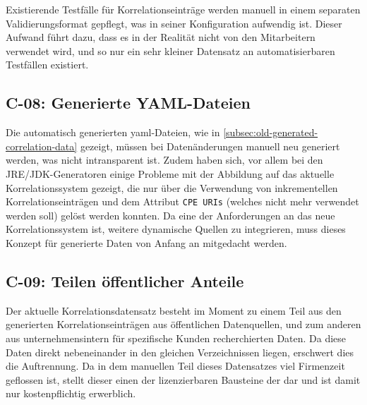 Existierende Testfälle für Korrelationseinträge werden manuell in einem separaten Validierungsformat gepflegt, was in seiner Konfiguration aufwendig ist.
Dieser Aufwand führt dazu, dass es in der Realität nicht von den Mitarbeitern verwendet wird, und so nur ein sehr kleiner Datensatz an automatisierbaren Testfällen existiert.

\subsection{C-08: Generierte YAML-Dateien}\label{subsec:c-08-generated-correlation-data}


Die automatisch generierten \acrshort{yaml}-Dateien, wie in \autoref{subsec:old-generated-correlation-data} gezeigt, müssen bei Datenänderungen manuell neu generiert werden, was nicht intransparent ist.
Zudem haben sich, vor allem bei den JRE/JDK-Generatoren einige Probleme mit der Abbildung auf das aktuelle Korrelationssystem gezeigt, die nur über die Verwendung von inkrementellen Korrelationseinträgen und dem Attribut \texttt{CPE URIs} (welches nicht mehr verwendet werden soll) gelöst werden konnten.
Da eine der Anforderungen an das neue Korrelationssystem ist, weitere dynamische Quellen zu integrieren, muss dieses Konzept für generierte Daten von Anfang an mitgedacht werden.

\subsection{C-09: Teilen öffentlicher Anteile}\label{subsec:c-09-sharing-of-public-data}


Der aktuelle Korrelationsdatensatz besteht im Moment zu einem Teil aus den generierten Korrelationseinträgen aus öffentlichen Datenquellen, und zum anderen aus unternehmensintern für spezifische Kunden recherchierten Daten.
Da diese Daten direkt nebeneinander in den gleichen Verzeichnissen liegen, erschwert dies die Auftrennung.
Da in dem manuellen Teil dieses Datensatzes viel Firmenzeit geflossen ist, stellt dieser einen der lizenzierbaren Bausteine der \metaeffektsp dar und ist damit nur kostenpflichtig erwerblich.


